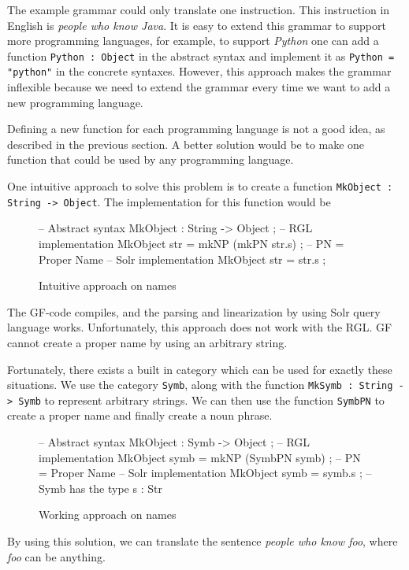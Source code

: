The example grammar could only translate one instruction. This instruction in English is \emph{people who know Java}. It is easy to extend this grammar to support more programming languages, for example, to support \emph{Python} one can add a function \texttt{Python : Object} in the abstract syntax and implement it as \texttt{Python = "python"} in the concrete syntaxes. However, this approach makes the grammar inflexible because we need to extend the grammar every time we want to add a new programming language.

Defining a new function for each programming language is not a good idea, as described in the previous section. A better solution would be to make one function that could be used by any programming language.

One intuitive approach to solve this problem is to create a function \texttt{MkObject : String -> Object}. The implementation for this function would be 
\begin{figure}[H]
\begin{code}
-- Abstract syntax
MkObject : String -> Object ;
-- RGL implementation
MkObject str = mkNP (mkPN str.s) ; -- PN = Proper Name
-- Solr implementation
MkObject str = str.s ;
\end{code}
\caption{Intuitive approach on names}
\end{figure}

The GF-code compiles, and the parsing and linearization by using Solr query language works. Unfortunately, this approach does not work with the RGL. GF cannot create a proper name by using an arbitrary string. 

Fortunately, there exists a built in category which can be used for exactly these situations. We use the category \texttt{Symb}, along with the function \texttt{MkSymb : String -> Symb} to represent arbitrary strings. We can then use the function \texttt{SymbPN} to create a proper name and finally create a noun phrase.
\begin{figure}[H]
\begin{code}
-- Abstract syntax
MkObject : Symb -> Object ;
-- RGL implementation
MkObject symb = mkNP (SymbPN symb) ; -- PN = Proper Name
-- Solr implementation
MkObject symb = symb.s ; -- Symb has the type { s : Str }
\end{code}
\caption{Working approach on names}
\end{figure}

By using this solution, we can translate the sentence \emph{people who know foo}, where \emph{foo} can be anything.

